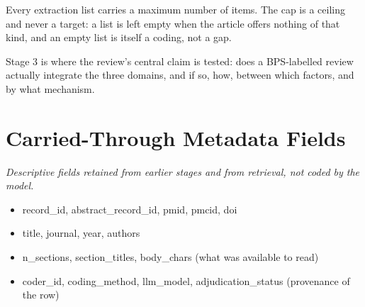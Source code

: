 \documentclass[11pt]{article}
\begin{document}
Every extraction list carries a maximum number of items. The cap is a ceiling and never a target: a list is left empty when the article offers nothing of that kind, and an empty list is itself a coding, not a gap.

Stage 3 is where the review's central claim is tested: does a BPS-labelled review actually integrate the three domains, and if so, how, between which factors, and by what mechanism.


\section*{Carried-Through Metadata Fields}
{\small\itshape Descriptive fields retained from earlier stages and from retrieval, not coded by the model.}\par\smallskip
\begin{itemize}
\item record\_id, abstract\_record\_id, pmid, pmcid, doi
\item title, journal, year, authors
\item n\_sections, section\_titles, body\_chars (what was available to read)
\item coder\_id, coding\_method, llm\_model, adjudication\_status (provenance of the row)
\end{itemize}
\end{document}
